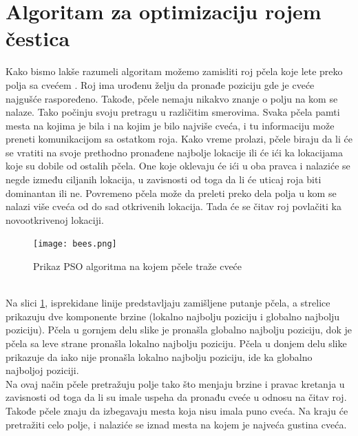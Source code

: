 \documentclass[a4paper]{article}
\begin{document}
\section{Algoritam za optimizaciju rojem čestica}
Kako bismo lakše razumeli algoritam možemo zamisliti roj pčela koje lete preko polja sa cvećem \cite{10.4018/IJRSDA.2018040101}. Roj ima urođenu želju da pronađe poziciju gde je cveće najgušće raspoređeno. Takođe, pčele nemaju nikakvo znanje o polju na kom se nalaze. Tako počinju svoju pretragu u različitim smerovima. Svaka pčela pamti mesta na kojima je bila i na kojim je bilo najviše cveća, i tu informaciju može preneti komunikacijom sa ostatkom roja. Kako vreme prolazi, pčele biraju da li će se vratiti na svoje prethodno pronađene najbolje lokacije ili će ići ka lokacijama koje su dobile od ostalih pčela. One koje oklevaju će ići u oba pravca i nalaziće se negde između ciljanih lokacija, u zavisnosti od toga da li će uticaj roja biti dominantan ili ne. Povremeno pčela može da preleti preko dela polja u kom se nalazi više cveća od do sad otkrivenih lokacija. Tada će se čitav roj povlačiti ka novootkrivenoj lokaciji.
\begin{figure}[htp]
    \centering
    \texttt{[image: bees.png]}
    \caption{Prikaz PSO algoritma na kojem pčele traže cveće}
    \label{fig:bees}
\end{figure}
\\ \indent Na slici \ref{fig:bees}, isprekidane linije predstavljaju zamišljene putanje pčela, a strelice prikazuju dve komponente brzine (lokalno najbolju poziciju i globalno najbolju poziciju). Pčela u gornjem delu slike je pronašla globalno najbolju poziciju, dok je pčela sa leve strane pronašla lokalno najbolju poziciju. Pčela u donjem delu slike prikazuje da iako nije pronašla lokalno najbolju poziciju, ide ka globalno najboljoj poziciji. \\
\indent Na ovaj način pčele pretražuju polje tako što menjaju brzine i pravac kretanja u zavisnosti od toga da li su imale uspeha da pronađu cveće u odnosu na čitav roj. Takođe pčele znaju da izbegavaju mesta koja nisu imala puno cveća. Na kraju će pretražiti celo polje, i nalaziće se iznad mesta na kojem je najveća gustina cveća.
\end{document}
